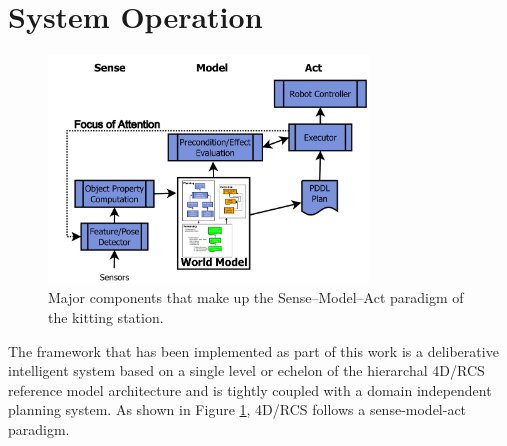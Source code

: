 %
\section{System Operation}
\label{sect:operation}
%
\begin{figure}[htb!]
\begin{center}
\includegraphics[width=8.5cm]{images/SenseModelAct.jpg}
\caption{Major components that make up the Sense--Model--Act paradigm of the kitting station.}
\label{fig:SenseModelAct}
\end{center}
\end{figure}
The framework that has been implemented as part of this work 
is a deliberative intelligent system based on a single 
level or echelon of the hierarchal 4D/RCS 
reference model architecture \cite{Albus2000} and is
tightly coupled with a domain independent planning system. As shown
in Figure \ref{fig:SenseModelAct}, 4D/RCS 
follows a sense-model-act paradigm. 
%
